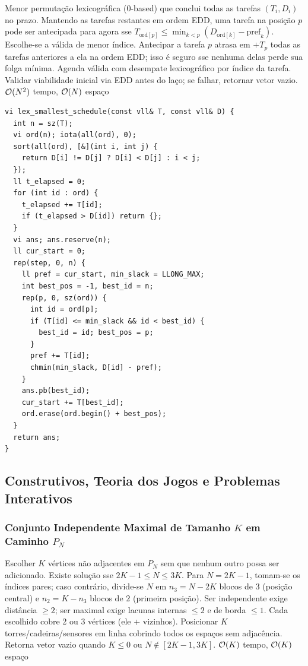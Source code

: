\algobox
  {Menor permutação lexicográfica (0-based) que conclui todas as tarefas $(T_i, D_i)$ no prazo.}
  {Mantendo as tarefas restantes em ordem EDD, uma tarefa na posição $p$ pode ser antecipada para agora sse $T_{\text{ord}[p]} \le \min_{k < p} (D_{\text{ord}[k]} - \text{pref}_k)$. Escolhe-se a válida de menor índice.}
  {Antecipar a tarefa $p$ atrasa em $+T_p$ todas as tarefas anteriores a ela na ordem EDD; isso é seguro sse nenhuma delas perde sua folga mínima.}
  {Agenda válida com desempate lexicográfico por índice da tarefa.}
  {Validar viabilidade inicial via EDD antes do laço; se falhar, retornar vetor vazio.}
  {$\mathcal{O}(N^2)$ tempo, $\mathcal{O}(N)$ espaço}

\begin{lstlisting}
vi lex_smallest_schedule(const vll& T, const vll& D) {
  int n = sz(T);
  vi ord(n); iota(all(ord), 0);
  sort(all(ord), [&](int i, int j) {
    return D[i] != D[j] ? D[i] < D[j] : i < j;
  });
  ll t_elapsed = 0;
  for (int id : ord) {
    t_elapsed += T[id];
    if (t_elapsed > D[id]) return {};
  }
  vi ans; ans.reserve(n);
  ll cur_start = 0;
  rep(step, 0, n) {
    ll pref = cur_start, min_slack = LLONG_MAX;
    int best_pos = -1, best_id = n;
    rep(p, 0, sz(ord)) {
      int id = ord[p];
      if (T[id] <= min_slack && id < best_id) {
        best_id = id; best_pos = p;
      }
      pref += T[id];
      chmin(min_slack, D[id] - pref);
    }
    ans.pb(best_id);
    cur_start += T[best_id];
    ord.erase(ord.begin() + best_pos);
  }
  return ans;
}
\end{lstlisting}

\subsection{Construtivos, Teoria dos Jogos e Problemas Interativos}

\subsubsection{Conjunto Independente Maximal de Tamanho $K$ em Caminho $P_N$}
\algobox
  {Escolher $K$ vértices não adjacentes em $P_N$ sem que nenhum outro possa ser adicionado.}
  {Existe solução sse $2K - 1 \le N \le 3K$. Para $N = 2K - 1$, tomam-se os índices pares; caso contrário, divide-se $N$ em $n_3 = N - 2K$ blocos de $3$ (posição central) e $n_2 = K - n_3$ blocos de $2$ (primeira posição).}
  {Ser independente exige distância $\ge 2$; ser maximal exige lacunas internas $\le 2$ e de borda $\le 1$. Cada escolhido cobre 2 ou 3 vértices (ele + vizinhos).}
  {Posicionar $K$ torres/cadeiras/sensores em linha cobrindo todos os espaços sem adjacência.}
  {Retorna vetor vazio quando $K \le 0$ ou $N \notin [2K-1, 3K]$.}
  {$\mathcal{O}(K)$ tempo, $\mathcal{O}(K)$ espaço}

